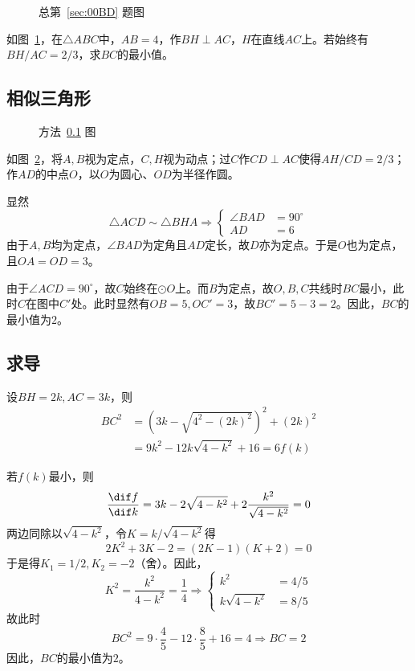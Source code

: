 

\begin{figure}[htbp]
  \centering {}
  \caption{总第~\ref{sec:00BD} 题图}
  \label{fig:00BD}
\end{figure}

如图~\ref{fig:00BD}，在$\triangle ABC$中，$AB = 4$，作$BH \perp AC$，$H$在直线$AC$上。若始终有$BH/AC = 2/3$，求$BC$的最小值。


\subsection{相似三角形} \label{subsec:00BD-sim}

\begin{figure}[htbp]
  \centering {}
  \caption{方法~\ref{subsec:00BD-sim} 图}
  \label{fig:00BD-sim}
\end{figure}

如图~\ref{fig:00BD-sim}，将$A, B$视为定点，$C, H$视为动点；过$C$作$CD \perp AC$使得$AH/CD = 2/3$；作$AD$的中点$O$，以$O$为圆心、$OD$为半径作圆。

显然
\[ \triangle ACD \sim \triangle BHA \Rightarrow \left\{ \begin{aligned}
  \angle BAD &= 90^\circ \\ AD &= 6
\end{aligned} \right. \]
由于$A, B$均为定点，$\angle BAD$为定角且$AD$定长，故$D$亦为定点。于是$O$也为定点，且$OA = OD = 3$。

由于$\angle ACD = 90^\circ$，故$C$始终在$\odot O$上。而$B$为定点，故$O, B, C$共线时$BC$最小，此时$C$在图中$C'$处。此时显然有$OB = 5, OC' = 3$，故$BC' = 5 - 3 = 2$。因此，$BC$的最小值为$2$。

\subsection{求导}

设$BH = 2k, AC = 3k$，则
\begin{align*}
  BC^2 &= \left(3k - \sqrt{4^2 - (2k)^2}\right)^2 + (2k)^2 \\
  &= 9k^2 - 12k\sqrt{4 - k^2} + 16 = 6f(k)
\end{align*}

若$f(k)$最小，则
\[ \frac{\dif f}{\dif k} = 3k - 2\sqrt{4 - k^2} + 2\frac{k^2}{\sqrt{4 - k^2}} = 0 \]
两边同除以$\sqrt{4 - k^2}$，令$K = k/\sqrt{4 - k^2}$得
\[ 2K^2 + 3K - 2 = (2K - 1)(K + 2) = 0 \]
于是得$K_1 = 1/2, K_2 = -2$（舍）。因此，
\[ K^2 = \frac{k^2}{4 - k^2} = \frac14 \Rightarrow \left\{ \begin{aligned}
  k^2 &= 4/5 \\ k\sqrt{4 - k^2} &= 8/5
\end{aligned} \right. \]
故此时
\[ BC^2 = 9\cdot\frac45 - 12\cdot\frac85 + 16 = 4 \Rightarrow BC = 2 \]
因此，$BC$的最小值为$2$。
